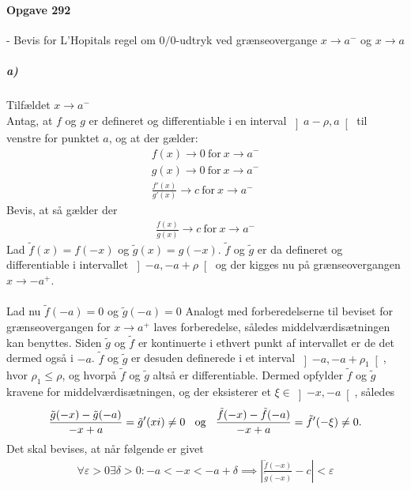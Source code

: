 \documentclass[12pt]{article}
\begin{document}
\maketitle

\paragraph{Opgave 292} - Bevis for L'Hopitals regel om $0/0$-udtryk ved grænseovergange $x \to a^-$ og $x \to a$\\

\subparagraph{a)}  Tilfældet $x \to a^-$ \\
Antag, at $f$ og $g$ er defineret og differentiable i en interval $\left] a - \rho,a\right[$ til venstre for punktet $a$, og at der gælder: 
\begin{align}
f(x) \to 0 \ \text{for} \ x \to a^- \\
g(x) \to 0 \ \text{for} \ x \to a^- \\
\frac{f'(x)}{g'(x)}\to c \ \text{for} \ x \to a^- \label{eq:3}
\end{align}
Bevis, at så gælder der 
\begin{align}
\frac{f(x)}{g(x)}\to c \ \text{for} \ x \to a^-
\end{align}
Lad $\tilde{f}(x)=f(-x)$ og $\tilde{g}(x)=g(-x)$. $\tilde{f}$ og $\tilde{g}$ er da defineret og differentiable i intervallet $\left]-a,-a+\rho\right[$ og der kigges nu på grænseovergangen $x \to -a^+$.\\
\\
Lad nu $\tilde{f}(-a)=0$ og $\tilde{g}(-a)=0$ Analogt med forberedelserne til beviset for grænseovergangen for $x \to a^+$ laves forberedelse, således middelværdisætningen kan benyttes. Siden $\tilde{g}$ og $\tilde{f}$ er kontinuerte i ethvert punkt af intervallet er de det dermed også i $-a$. $\tilde{f}$ og $\tilde{g}$ er desuden definerede i et interval $\left]-a,-a+\rho_1\right[$, hvor $\rho_1\leq\rho$, og hvorpå $\tilde{f}$ og $\tilde{g}$ altså er differentiable. Dermed opfylder $\tilde{f}$ og $\tilde{g}$ kravene for middelværdisætningen, og der eksisterer et $\xi\in\left]-x,-a\right[$, således
\begin{align}
\frac{\tilde{g}(-x)-\tilde{g}(-a)}{-x+a}=\tilde{g}'(\-xi) \neq0 \phantom{m} \text{og} \phantom{m} \frac{\tilde{f}(-x)-\tilde{f}(-a)}{-x+a}=\tilde{f}'(-\xi)\neq0.
\end{align}
Det skal bevises, at når følgende er givet 
\begin{align}
\forall \varepsilon > 0 \exists \delta > 0 : -a < -x < -a + \delta \implies \left| \frac{\tilde{f}(-x)}{\tilde{g}(-x)}-c \right| < \varepsilon \label{eq:1}
\end{align}
\end{document}
